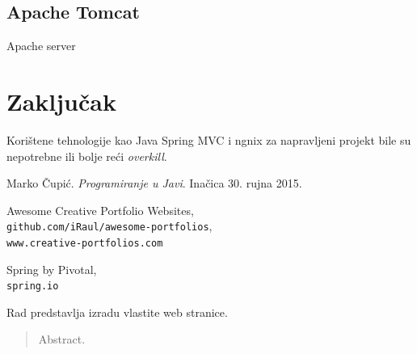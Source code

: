\documentclass[times, utf8, zavrsni, numeric]{fer}
\begin{document}
\section{Apache Tomcat}
\qquad Apache server

\chapter{Zaključak}
Korištene tehnologije kao Java Spring MVC i ngnix za napravljeni projekt bile su nepotrebne ili bolje reći \textit{overkill}\footnotemark.



\begin{thebibliography}{9}
\bibitem{}
				Marko Čupić.
				\textit{Programiranje u Javi}.
				Inačica 30. rujna 2015.

				Awesome Creative Portfolio Websites,
				\\\texttt{github.com/iRaul/awesome-portfolios},
				\\\texttt{www.creative-portfolios.com}

				Spring by Pivotal,
				\\\texttt{spring.io}
\end{thebibliography}

\begin{sazetak}
\qquad Rad predstavlja izradu vlastite web stranice.

\end{sazetak}

\begin{abstract}
Abstract.

\end{abstract}
\end{document}
